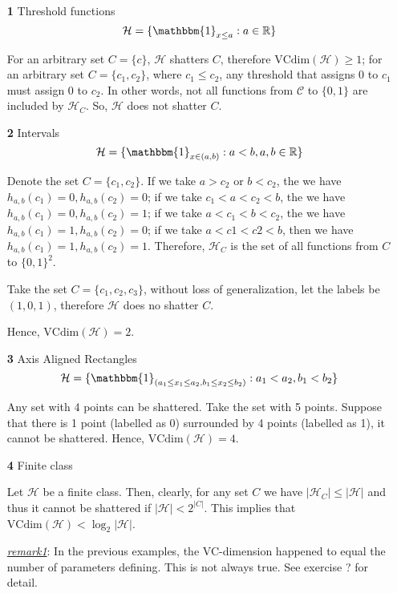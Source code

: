 \documentclass{article}
\begin{document}
	\begin{itemize}
	\item [\textbf{1}] Threshold functions
		\begin{equation*}
		\mathcal{H}=\{\mathbbm{1}_{x\leq a}:a\in\mathbb{R}\}
		\end{equation*}
		
	For an arbitrary set $C=\{c\}$, $\mathcal{H}$ shatters $C$, therefore $\mathrm{VCdim}(\mathcal{H})\geq 1$; for an arbitrary set $C=\{c_1,c_2\}$, where $c_1\leq c_2$, any threshold that assigns 0 to $c_1$ must assign 0 to $c_2$. In other words, not all functions from $\mathcal{C}$ to $\{0,1\}$ are included by $\mathcal{H}_C$. So, $\mathcal{H}$ does not shatter $C$.
	
	\item [\textbf{2}] Intervals
		\begin{equation*}
		\mathcal{H}=\{\mathbbm{1}_{x\in(a,b)}:a<b,a,b\in\mathbb{R}\}
		\end{equation*}
	
	Denote the set $C=\{c_1, c_2\}$. If we take $a>c_2$ or $b<c_2$, the we have $h_{a,b}(c_1)=0, h_{a,b}(c_2)=0$; if we take $c_1<a<c_2<b$, the we have $h_{a,b}(c_1)=0, h_{a,b}(c_2)=1$; if we take $a<c_1<b<c_2$, the we have $h_{a,b}(c_1)=1, h_{a,b}(c_2)=0$; if we take $a<c1<c2<b$, then we have $h_{a,b}(c_1)=1, h_{a,b}(c_2)=1$. Therefore, $\mathcal{H}_C$ is the set of all functions from $C$ to $\{0,1\}^2$.
		
	Take the set $C=\{c_1,c_2,c_3\}$, without loss of generalization, let the labels be  $(1,0,1)$, therefore $\mathcal{H}$ does no shatter $C$.
	
	Hence, $\mathrm{VCdim}(\mathcal{H})=2$.
	
	\item [\textbf{3}] Axis Aligned Rectangles
		\begin{equation*}
		\mathcal{H}=\{\mathbbm{1}_{(a_1\leq x_1\leq a_2,b_1\leq x_2\leq b_2)}:a_1<a_2,b_1<b_2\}
		\end{equation*}
	
	Any set with 4 points can be shattered. Take the set with 5 points. Suppose that there is 1 point (labelled as 0) surrounded by 4 points (labelled as 1), it cannot be shattered. Hence, $\mathrm{VCdim}(\mathcal{H})=4$.
	
	\item [\textbf{4}] Finite class
	
	Let $\mathcal{H}$ be a finite class. Then, clearly, for any set $C$ we have $|\mathcal{H}_C|\leq|\mathcal{H}|$ and thus it cannot be shattered if $|\mathcal{H}|<2^{|C|}$. This implies that $\mathrm{VCdim}(\mathcal{H})<\log_2|\mathcal{H}|$.
	
	\textit{\underline{remark1}}: In the previous examples, the VC-dimension happened to equal the number of parameters defining.  This is not always true. See exercise ? for detail.
	\end{itemize}
\end{document}
